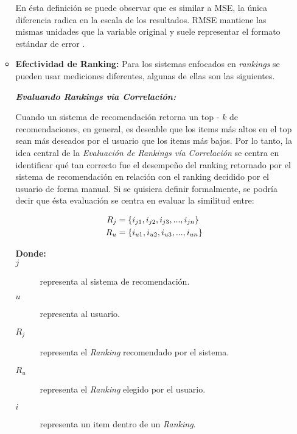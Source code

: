 \begin{itemize}
\begin{itemize}[label=$\diamond$]
            En ésta definición se puede observar que es similar a MSE, la única diferencia radica en la escala de los resultados. RMSE mantiene las mismas unidades que la variable original y suele representar el formato estándar de error \parencite{gmd-15-5481-2022}.

            \newpage
            \thispagestyle{plain}
            \vspace*{0.2cm}

            \item \textbf{Efectividad de Ranking: } Para los sistemas enfocados en \textit{rankings} se pueden usar mediciones diferentes, algunas de ellas son las siguientes.
            
            \textbf{\textit{Evaluando Rankings vía Correlación: }}

            Cuando un sistema de recomendación retorna un top - $k$ de recomendaciones, en general, es deseable que los items más altos en el top sean más deseados por el usuario que los items más bajos.
            Por lo tanto, la idea central de la \textit{Evaluación de Rankings vía Correlación} se centra en identificar qué tan correcto fue el desempeño del ranking retornado por el sistema de recomendación en relación con el ranking decidido por el usuario de forma manual. 
            Si se quisiera definir formalmente, se podría decir que ésta evaluación se centra en evaluar la similitud entre:

            \begin{equation}
                \begin{split}
                    R_j &= \{ i_{j1}, i_{j2}, i_{j3}, ..., i_{jn} \}\\
                    R_u &= \{ i_{u1}, i_{u2}, i_{u3}, ..., i_{un} \}
                \end{split}
                \addequation{Definición de Rankings de Usuario y de Sistema}
            \end{equation}  

            \begin{description}
                \item[\textbf{Donde:}]
                \item[$j$] representa al sistema de recomendación.
                \item[$u$] representa al usuario.
                \item[$R_j$] representa el \textit{Ranking} recomendado por el sistema.
                \item[$R_u$] representa el \textit{Ranking} elegido por el usuario.
                \item[$i$]  representa un item dentro de un \textit{Ranking}.      
            \end{description}


\end{itemize}
\end{itemize}
